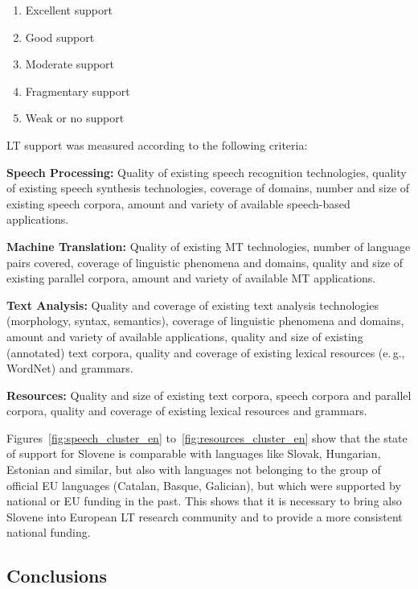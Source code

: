\begin{multicols}{2}
\begin{enumerate}
\item Excellent support
\item Good support
\item Moderate support
\item Fragmentary support
\item Weak or no support
\end{enumerate}

LT support was measured according to the following criteria:

\textbf{Speech Processing:} Quality of existing speech recognition technologies, quality of existing speech synthesis technologies, coverage of domains, number and size of existing speech corpora, amount and variety of available speech-based applications.%

\textbf{Machine Translation:} Quality of existing MT technologies, number of language pairs covered, coverage of linguistic phenomena and domains, quality and size of existing parallel corpora, amount and variety of available MT applications.%

\textbf{Text Analysis:} Quality and coverage of existing text analysis technologies (morphology, syntax, semantics), coverage of linguistic phenomena and domains, amount and variety of available applications, quality and size of existing (annotated) text corpora, quality and coverage of existing lexical resources (e.\,g., WordNet) and grammars.%

\textbf{Resources:} Quality and size of existing text corpora, speech corpora and parallel corpora, quality and coverage of existing lexical resources and grammars.

Figures~\ref{fig:speech_cluster_en} to~\ref{fig:resources_cluster_en} show that the state of support for Slovene is comparable with languages like Slovak, Hungarian, Estonian and similar, but also with languages not belonging to the group of official EU languages (Catalan, Basque, Galician), but which were supported by national or EU funding in the past. This shows that it is necessary to bring also Slovene into European LT research community and to provide a more consistent national funding.

\subsection{Conclusions}


\end{multicols}

